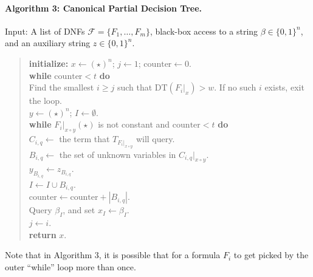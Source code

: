 \documentclass[10pt,a4paper]{article}
\begin{document}
\paragraph{Algorithm 3: Canonical Partial Decision Tree.} Input: A list of DNFs $\mathcal F=\{F_1,\ldots,F_m\}$, black-box access to a string $\beta\in\{0,1\}^n$, and an auxiliary string $z\in\{0,1\}^n$.
\begin{quote}\textbf{initialize:} $x\leftarrow(\star)^n$; $j\leftarrow1$; $\mathrm{counter}\leftarrow0$.\\
\textbf{while} $\mathrm{counter}<t$ \textbf{do}\\
\hspace*{1em}Find the smallest $i\ge j$ such that $\mathrm{DT}(F_i|_x)>w$. If no such $i$ exists, exit the loop.\\
\hspace*{1em}$y\leftarrow(\star)^n$; $I\leftarrow\emptyset$.\\
\hspace*{1em}\textbf{while} $F_i|_{x\circ y}(\star)$ is not constant and $\mathrm{counter}<t$ \textbf{do}\\
\hspace*{2em}$C_{i,q}\leftarrow$ the term that $T_{F_i|_{x\circ y}}$ will query.\\
\hspace*{2em}$B_{i,q}\leftarrow$ the set of unknown variables in $C_{i,q}|_{x\circ y}$.\\
\hspace*{2em}$y_{B_{i,q}}\leftarrow z_{B_{i,q}}$.\\
\hspace*{2em}$I\leftarrow I\cup B_{i,q}$.\\
\hspace*{2em}$\mathrm{counter}\leftarrow\mathrm{counter}+|B_{i,q}|$.\\
\hspace*{1em}Query $\beta_I$, and set $x_I\leftarrow\beta_I$.\\
\hspace*{1em}$j\leftarrow i$.\\
\textbf{return} $x$.\end{quote}
Note that in Algorithm 3, it is possible that for a formula $F_i$ to get picked by the outer ``while'' loop more than once.
\end{document}
